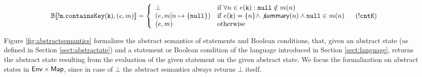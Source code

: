 \begin{figure*}
\[\begin{array}{ll}
\mathbb{B}\llbracket \mathtt{! m.containsKey(k)}, (e, m) \rrbracket = \left\{
\begin{array}{ll}
\bot & \textrm{if } \forall n \in e(\mathtt{k}) : \mathtt{null} \notin m(n)\\
(e, m[n \mapsto \{\mathtt{null}\}) & \textrm{if } e(\mathtt{k}) = \{n\} \land \not \mathsf{summary}(n) \land \mathtt{null} \in m(n)\\
(e, m) & \textrm{otherwise}\\
\end{array}
\right. & (\mathtt{!cntK})\\
\end{array}
\]
\caption{Formal definition of the abstract semantics}
\label{fig:abstractsemantics}
\end{figure*}
Figure \ref{fig:abstractsemantics} formalizes the abstract semantics of statements and Boolean conditions, that, given an abstract state (as defined in Section \ref{sect:abstractate}) and a statement or Boolean condition of the language introduced in Section \ref{sect:language}, returns the abstract state resulting from the evaluation of the given statement on the given abstract state. We focus the formalization on abstract states in $\mathsf{Env} \times \mathsf{Map}$, since in case of $\bot$ the abstract semantics always returns $\bot$ itself.

